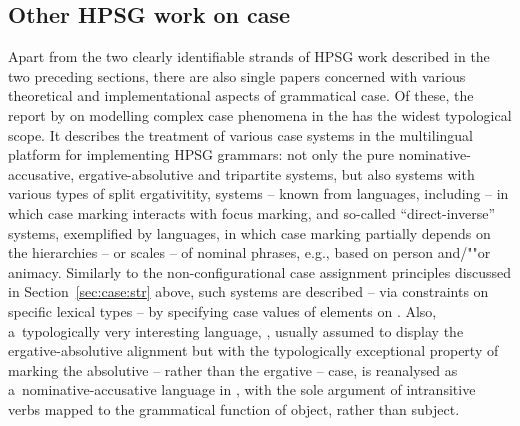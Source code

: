 \documentclass[output=paper
 	        ,biblatex
                ,babelshorthands
                ,newtxmath
                ,draftmode
                ,colorlinks, citecolor=brown
]{langscibook}
\begin{document}
\begin{exe}
\begin{xlist}
\begin{exe}
\begin{xlist}
\section{Other HPSG work on case}
\label{sec:case:other}

Apart from the two clearly identifiable strands of HPSG work described in the two preceding sections, there are also single papers concerned with various theoretical and implementational aspects of grammatical case.  Of these, the report by \citet{drel:08} on modelling complex case phenomena in the  \citep{BFO2002a-u} has the widest typological scope.  It describes the treatment of various case systems in the multilingual platform for implementing HPSG grammars: not only the pure nominative-accusative, ergative-absolutive and tripartite systems, but also systems with various types of split ergativitity, systems – known from  languages, including  – in which case marking interacts with focus marking, and so-called “direct-inverse” systems, exemplified by  languages, in which case marking partially depends on the hierarchies – or scales – of nominal phrases, e.g., based on person and/""or animacy.  Similarly to the non-configurational case assignment principles discussed in Section~\ref{sec:case:str} above, such systems are described – via constraints on specific lexical types – by specifying case values of elements on .  Also, a~typologically very interesting language, , usually assumed to display the ergative-absolutive alignment but with the typologically exceptional property of marking the absolutive – rather than the ergative – case, is reanalysed as a~nominative-accusative language in \citet{Crysmann2009b-u}, with the sole argument of intransitive verbs mapped to the grammatical function of object, rather than subject.


\end{xlist}
\end{exe}
\end{xlist}
\end{exe}
\end{document}
